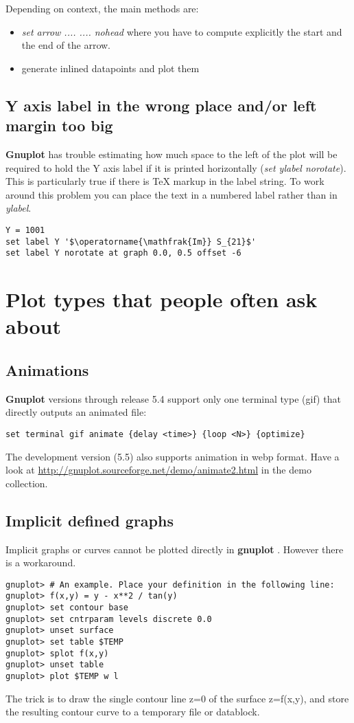 \documentclass[letter,11pt]{article}
\def\http#1{{\small\href{http://#1}{\url{http://#1}}}}
\newcommand{\http}[1]%
            {\htmladdnormallink{\latex{\url{http://#1}}%
                    \html{\textit{http://#1}}}%
                {http://#1}%
            }
\newcommand{\gnuplot}{\textbf{gnuplot }}
\newcommand{\Gnuplot}{\textbf{Gnuplot }}
\begin{document}
{Depending on context, the main methods are:
\begin{itemize}
\item {\em set arrow .... .... nohead} where you have to compute
explicitly the start and the end of the arrow.
\item generate inlined datapoints and plot them
\end{itemize}

\subsection{Y axis label in the wrong place and/or left margin too big}
\Gnuplot has trouble estimating how much space to the left of the plot
will be required to hold the Y axis label if it is printed horizontally
({\em set ylabel norotate}).  This is particularly true if there is
TeX markup in the label string.  To work around this problem you can place
the text in a numbered label rather than in {\em ylabel}.
\small
\begin{verbatim}
Y = 1001
set label Y '$\operatorname{\mathfrak{Im}} S_{21}$'
set label Y norotate at graph 0.0, 0.5 offset -6
\end{verbatim}
\normalsize

\section{Plot types that people often ask about}

\subsection{Animations}

\Gnuplot versions through release 5.4 support only one terminal type
(gif) that directly outputs an animated file:
\begin{verbatim}
set terminal gif animate {delay <time>} {loop <N>} {optimize}
\end{verbatim}

The development version (5.5) also supports animation in webp format.
Have a look at
\http{gnuplot.sourceforge.net/demo/animate2.html}
in the demo collection.

\subsection{Implicit defined graphs}

Implicit graphs or curves cannot be plotted directly in \gnuplot.
However there is a workaround.
\small
\begin{verbatim}
gnuplot> # An example. Place your definition in the following line:
gnuplot> f(x,y) = y - x**2 / tan(y)
gnuplot> set contour base
gnuplot> set cntrparam levels discrete 0.0
gnuplot> unset surface
gnuplot> set table $TEMP
gnuplot> splot f(x,y)
gnuplot> unset table
gnuplot> plot $TEMP w l
\end{verbatim}
\normalsize
The trick is to draw the single contour line z=0 of the surface
z=f(x,y), and store the resulting contour curve to a temporary file or datablock.


}
\end{document}
